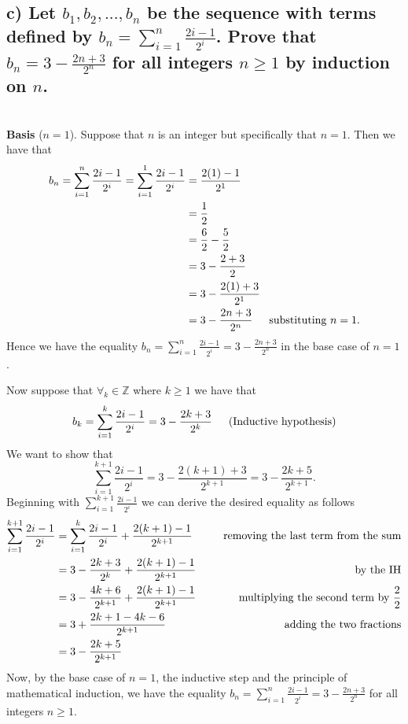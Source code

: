 \documentclass[11pt, letterpaper]{article}
\begin{document}
\subsection*{c) Let $b_1, b_2, ..., b_n$ be the sequence with terms defined by $b_n=\sum_{i=1}^n \frac{2i-1}{2^i}$. Prove that $b_n=3-\frac{2n+3}{2^n}$ for all integers $n\geq 1$ by induction on $n$.}
\begin{prf}[by induction]~\\
    {\bf Basis} ($n=1$). Suppose that $n$ is an integer but specifically that $n=1$. Then we have that
    \begin{align*}
        b_n=\sum_{i=1}^n \frac{2i-1}{2^i}=\sum_{i=1}^1 \frac{2i-1}{2^i} &= \frac{2(1)-1}{2^1}\\
        &= \frac{1}{2}\\
        &= \frac{6}{2}-\frac{5}{2}\\
        &= 3-\frac{2+3}{2}\\
        &= 3-\frac{2(1)+3}{2^1}\\
        &= 3-\frac{2n+3}{2^n} \text{\indent substituting $n=1$.}
    \end{align*}
    Hence we have the equality $b_n=\sum_{i=1}^n \frac{2i-1}{2^i}=3-\frac{2n+3}{2^n}$ in the base case of $n=1$.
    
     Now suppose that $\forall_k \in \mathbb{Z}$ where $k\geq 1$ we have that
    \[b_k=\sum_{i=1}^k \frac{2i-1}{2^i}=3-\frac{2k+3}{2^k} \text{\indent (Inductive hypothesis)}\]
    We want to show that 
    \[\sum_{i=1}^{k+1} \frac{2i-1}{2^i}=3-\frac{2(k+1)+3}{2^{k+1}}=3-\frac{2k+5}{2^{k+1}}\text{.}\]
    Beginning with $\sum_{i=1}^{k+1} \frac{2i-1}{2^i}$ we can derive the desired equality as follows
    \begin{align*}
        \sum_{i=1}^{k+1} \frac{2i-1}{2^i}&=\sum_{i=1}^{k} \frac{2i-1}{2^i} + \frac{2(k+1)-1}{2^{k+1}} &\text{\indent removing the last term from the sum}\\
        &= 3-\frac{2k+3}{2^k} + \frac{2(k+1)-1}{2^{k+1}} &\text{\indent by the IH}\\
        &= 3-\frac{4k+6}{2^{k+1}} + \frac{2(k+1)-1}{2^{k+1}} &\text{\indent multiplying the second term by $\frac{2}{2}$}\\
        &= 3+\frac{2k+1 - 4k-6}{2^{k+1}} &\text{\indent adding the two fractions}\\
        &= 3-\frac{2k+5}{2^{k+1}}
    \end{align*}
    Now, by the base case of $n=1$, the inductive step and the principle of mathematical induction, we have the equality $b_n=\sum_{i=1}^n \frac{2i-1}{2^i}=3-\frac{2n+3}{2^n}$ for all integers $n\geq 1$.
\end{prf}
\end{document}
